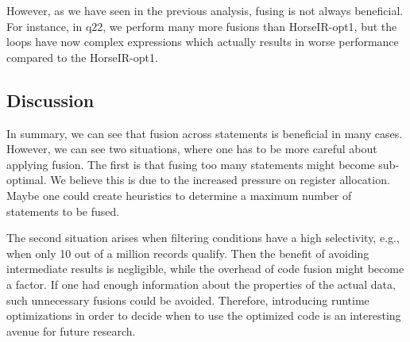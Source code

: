 However, as we have seen in the previous analysis, fusing is not always
beneficial. For instance, in q22, we perform many more fusions than
HorseIR-opt1, but the loops have now complex expressions which actually results
in worse performance compared to the HorseIR-opt1. 







\subsection{Discussion}

In summary, we can see that fusion across statements is beneficial in many
cases. However, we can see two situations, where one has to be more careful about
applying fusion. The first is that fusing too many statements might become
sub-optimal. We believe this is due to the increased pressure on register
allocation. Maybe one could create heuristics to determine a maximum number of
statements to be fused. 

The second situation arises when filtering conditions have a high selectivity,
e.g., when only 10 out of a million records qualify. Then the benefit of
avoiding intermediate results is negligible, while the overhead of code fusion
might become a factor. 
If one had enough information about the properties of the actual data, such
unnecessary fusions could be avoided. Therefore, introducing runtime
optimizations in order to decide when to use the optimized code is an
interesting avenue for future research. 




